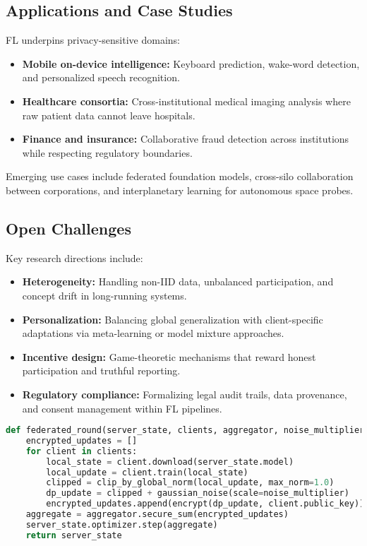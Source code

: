 \documentclass{article}
\begin{document}
\subsection{Applications and Case Studies}
FL underpins privacy-sensitive domains:
\begin{itemize}
  \item \textbf{Mobile on-device intelligence:} Keyboard prediction, wake-word detection, and personalized speech recognition.
  \item \textbf{Healthcare consortia:} Cross-institutional medical imaging analysis where raw patient data cannot leave hospitals.
  \item \textbf{Finance and insurance:} Collaborative fraud detection across institutions while respecting regulatory boundaries.
\end{itemize}
Emerging use cases include federated foundation models, cross-silo collaboration between corporations, and interplanetary learning for autonomous space probes.

\subsection{Open Challenges}
Key research directions include:
\begin{itemize}
  \item \textbf{Heterogeneity:} Handling non-IID data, unbalanced participation, and concept drift in long-running systems.
  \item \textbf{Personalization:} Balancing global generalization with client-specific adaptations via meta-learning or model mixture approaches.
  \item \textbf{Incentive design:} Game-theoretic mechanisms that reward honest participation and truthful reporting.
  \item \textbf{Regulatory compliance:} Formalizing legal audit trails, data provenance, and consent management within FL pipelines.
\end{itemize}
\FloatBarrier

\begin{lstlisting}[language=Python, caption={Federated averaging with secure aggregation and adaptive server optimizer.}]
def federated_round(server_state, clients, aggregator, noise_multiplier):
    encrypted_updates = []
    for client in clients:
        local_state = client.download(server_state.model)
        local_update = client.train(local_state)
        clipped = clip_by_global_norm(local_update, max_norm=1.0)
        dp_update = clipped + gaussian_noise(scale=noise_multiplier)
        encrypted_updates.append(encrypt(dp_update, client.public_key))
    aggregate = aggregator.secure_sum(encrypted_updates)
    server_state.optimizer.step(aggregate)
    return server_state
\end{lstlisting}
\FloatBarrier
\end{document}

